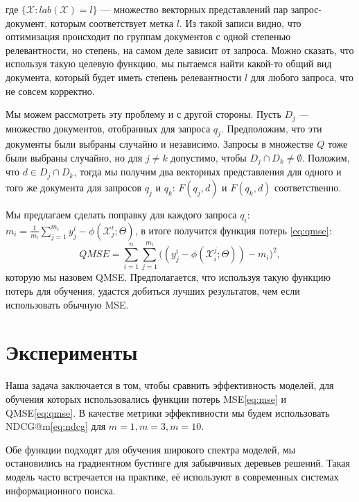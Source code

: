 \documentclass[specialist,
               substylefile = spbu.rtx,
               subf,href,colorlinks=true, 12pt]{disser}
\begin{document}
где $\{\mathcal X : lab(\mathcal X) = l\}$ --- множество векторных представлений пар запрос-документ, которым соответствует метка $l$. Из такой записи видно, что оптимизация происходит по группам документов с одной степенью релевантности, но степень, на самом деле зависит от запроса. Можно сказать, что используя такую целевую функцию, мы пытаемся найти какой-то общий вид документа, который будет иметь степень релевантности $l$ для любого запроса, что не совсем корректно.\par

Мы можем рассмотреть эту проблему и с другой стороны. Пусть $D_j$ --- множество документов, отобранных для запроса $q_j$. Предположим, что эти документы были выбраны случайно и независимо. Запросы в множестве $Q$ тоже были выбраны случайно, но для $j \neq k$ допустимо, чтобы $D_j \cap D_k \neq \emptyset$. Положим, что $d \in D_j \cap D_k$, тогда мы получим два векторных представления для одного и того же документа для запросов $q_j$ и $q_k$: $F(q_j, d)$ и $F(q_k, d)$ соответственно.\par

Мы предлагаем сделать поправку для каждого запроса $q_i$: $m_i = \frac{1}{m_i}\sum_{j=1}^{m_i}{y^i_j - \phi(\mathcal X^i_j; \Theta)}$, в итоге получится функция потерь \eqref{eq:qmse}:
\begin{equation}
\label{eq:qmse}
QMSE = \sum_{i=1}^{n}{\sum_{j=1}^{m_i}{\big( ( y^i_j -\phi(\mathcal X^j_i; \Theta)) - m_i \big)^2}},
\end{equation}
которую мы назовем QMSE. Предполагается, что используя такую функцию потерь для обучения, удастся добиться лучших результатов, чем если использовать обычную MSE.

\chapter{Эксперименты}

Наша задача заключается в том, чтобы сравнить эффективность моделей, для обучения которых использовались функции потерь MSE\eqref{eq:mse} и QMSE\eqref{eq:qmse}. В качестве метрики эффективности мы будем использовать NDCG@m\eqref{eq:ndcg} для $m=1, m=3, m=10$.\par

Обе функции подходят для обучения широкого спектра моделей, мы остановились на градиентном бустинге для забывчивых деревьев решений. Такая модель часто встречается на практике, её используют в современных системах информационного поиска.\par
\end{document}
